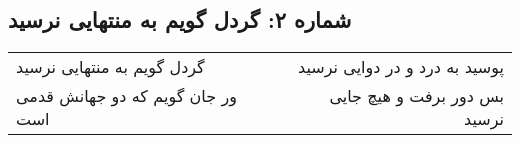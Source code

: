 \begin{center}
\section*{شماره ۲: گردل گویم به منتهایی نرسید}
\label{sec:002}
\begin{longtable}{l p{0.5cm} r}
گردل گویم به منتهایی نرسید
&&
پوسید به درد و در دوایی نرسید
\\
ور جان گویم که دو جهانش قدمی است
&&
بس دور برفت و هیچ جایی نرسید
\\
\end{longtable}
\end{center}
